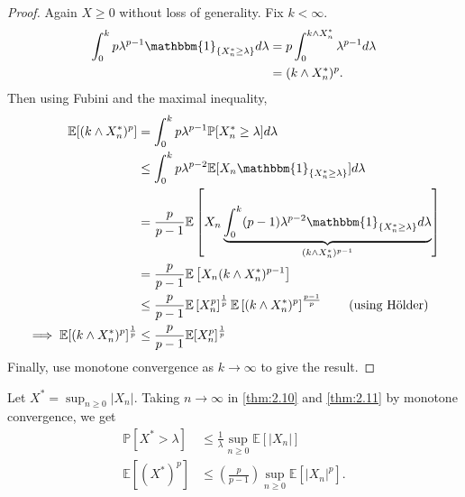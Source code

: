 \documentclass{article}
\newcommand{\1}[1]{\mathbbm{1}_{#1}}
\newcommand{\Prob}{\mathbb{P}}
\newcommand{\E}{\mathbb{E}}
\begin{document}
\begin{proof}
  Again $X \geq 0$ without loss of generality. Fix $k < \infty$.
  \begin{align*}
    \int_0^k p \lambda^{p-1} \1{\{X_n^* \geq \lambda\}} d\lambda &= p \int_0^{k \land X_n^*} \lambda^{p-1} d\lambda  \\
                                                                 &= (k \land X_n^*)^p
  .\end{align*}
  Then using Fubini and the maximal inequality,
  \begin{align*}
    \E[(k \land X_n^*)^p] &= \int_0^k p \lambda^{p-1} \Prob[X_n^* \geq \lambda] d \lambda \\
                         &\leq \int_0^k p \lambda^{p-2} \E[X_n \1{\{X_n^* \geq \lambda\}}] d \lambda \\
                         &= \frac{p}{p-1} \E\left[X_n \underbrace{\int_0^k (p-1) \lambda^{p-2} \1{\{X_n^* \geq \lambda\}} d \lambda}_{(k \land X_n^*)^{p-1}}\right] \\
                         &= \frac{p}{p-1} \E\left[X_n (k \land X_n^*)^{p-1}\right] \\
                         &\leq \frac{p}{p-1} \E\left[X_n^p\right]^{\frac{1}{p}} \E\left[(k \land X_n^*)^p\right]^{\frac{p-1}{p}} \tag{using H\"older} \\
    \implies \E[(k \land X_n^*)^p]^{\frac{1}{p}} &\leq \frac{p}{p-1} \E[X_n^p]^{\frac{1}{p}}
  \end{align*}
  Finally, use monotone convergence as $k \to \infty$ to give the result.
\end{proof}
Let $X^* = \sup_{n \geq 0} |X_n|$. Taking $n \to \infty$ in \cref{thm:2.10} and \cref{thm:2.11} by monotone convergence, we get
\begin{align*}
  \Prob[X^* > \lambda] &\leq \frac{1}{\lambda} \sup_{n \geq 0} \E[|X_n|] \\
  \E[(X^*)^p] &\leq \left(\frac{p}{p-1}\right) \sup_{n \geq 0} \E[|X_n|^p]
.\end{align*}
\newlec
\end{document}
